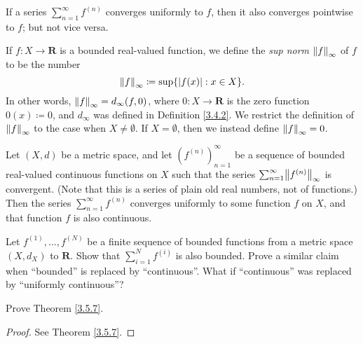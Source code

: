 \begin{note}
    If a series \(\sum_{n = 1}^\infty f^{(n)}\) converges uniformly to \(f\), then it also converges pointwise to \(f\);
    but not vice versa.
\end{note}

\setcounter{theorem}{4}
\begin{definition}\label{3.5.5}
    If \(f : X \to \mathbf{R}\) is a bounded real-valued function, we define the \emph{sup norm} \(\norm*{f}_\infty\) of \(f\) to be the number
    \[
        \norm*{f}_\infty \coloneqq \sup\{\abs*{f(x)} : x \in X\}.
    \]
    In other words, \(\norm*{f}_\infty = d_\infty(f, 0)\), where \(0 : X \to \mathbf{R}\) is the zero function \(0(x) \coloneqq 0\), and \(d_\infty\) was defined in Definition \ref{3.4.2}.
    We restrict the definition of \(\norm*{f}_\infty\) to the case when \(X \neq \emptyset\).
    If \(X = \emptyset\), then we instead define \(\norm*{f}_\infty = 0\).
\end{definition}

\setcounter{theorem}{6}
\begin{theorem}\label{3.5.7}
    Let \((X, d)\) be a metric space, and let \((f^{(n)})_{n = 1}^\infty\) be a sequence of bounded real-valued continuous functions on \(X\) such that the series \(\sum_{n = 1}^\infty \norm*{f^{(n)}}_\infty\) is convergent.
    (Note that this is a series of plain old real numbers, not of functions.)
    Then the series \(\sum_{n = 1}^\infty f^{(n)}\) converges uniformly to some function \(f\) on \(X\), and that function \(f\) is also continuous.
\end{theorem}

\exercisesection

\begin{exercise}\label{ex 3.5.1}
    Let \(f^{(1)}, \dots, f^{(N)}\) be a finite sequence of bounded functions from a metric space \((X, d_X)\) to \(\mathbf{R}\).
    Show that \(\sum_{i = 1}^N f^{(i)}\) is also bounded.
    Prove a similar claim when ``bounded'' is replaced by ``continuous''.
    What if ``continuous'' was replaced by ``uniformly continuous''?
\end{exercise}

\begin{exercise}\label{ex 3.5.2}
    Prove Theorem \ref{3.5.7}.
\end{exercise}

\begin{proof}
    See Theorem \ref{3.5.7}.
\end{proof}